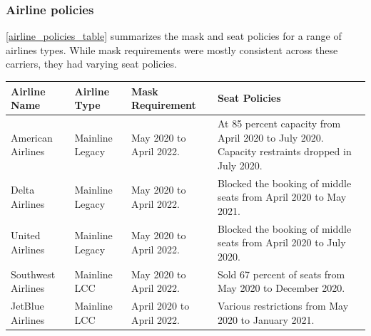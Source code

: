 \documentclass[11pt]{article}
\begin{document}
\subsubsection{Airline policies}
\cref{airline_policies_table} summarizes the mask and seat policies for a range of airlines types. While mask requirements were mostly consistent across these carriers, they had varying seat policies.

\begin{table}[htbp!]
\begin{tabular}{|p{4cm}|p{4cm}|p{4cm}|p{4cm}|}
\hline
\textbf{Airline Name} & \textbf{Airline Type} & \textbf{Mask Requirement} & \textbf{Seat Policies}                                                                                                                                                                                                                                           \\ \hline
American Airlines     & Mainline Legacy       & May 2020 to April 2022.   & At 85 percent capacity from April 2020 to July 2020. Capacity restraints dropped in July 2020.                                                                                                                                                                   \\ \hline
Delta Airlines        & Mainline Legacy       & May 2020 to April 2022.   & Blocked the booking of middle seats from April 2020 to May 2021.                                                                                                                                                                                                 \\ \hline
United Airlines       & Mainline Legacy       & May 2020 to April 2022.   & Blocked the booking of middle seats from April 2020 to July 2020.                                                                                                                                                                                                \\ \hline
Southwest Airlines    & Mainline LCC          & May 2020 to April 2022.   & Sold 67 percent of seats from May 2020 to December 2020.                                                                                                                                                                                                         \\ \hline
JetBlue Airlines      & Mainline LCC          & April 2020 to April 2022. & Various restrictions from May 2020 to January 2021. \\ \hline

\end{tabular}
\end{table}
\end{document}
